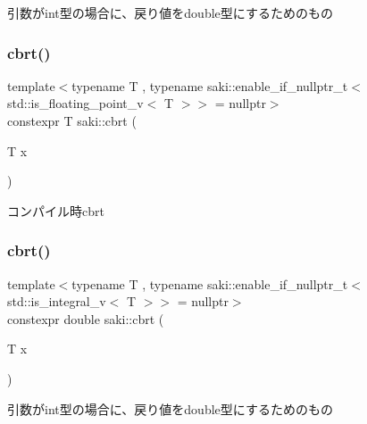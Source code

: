 引数がint型の場合に、戻り値をdouble型にするためのもの 

\mbox{\label{namespacesaki_a8836c929b71a61cf0151d3b76eb7af15}} 
\subsubsection{\texorpdfstring{cbrt()}{cbrt()}\hspace{0.1cm}{\footnotesize\ttfamily [1/2]}}
{\footnotesize\ttfamily template$<$typename T , typename saki\+::enable\+\_\+if\+\_\+nullptr\+\_\+t$<$ std\+::is\+\_\+floating\+\_\+point\+\_\+v$<$ T $>$$>$  = nullptr$>$ \\
constexpr T saki\+::cbrt (\begin{DoxyParamCaption}\item[{T}]{x }\end{DoxyParamCaption})}



コンパイル時cbrt 

\mbox{\label{namespacesaki_a5a3d1ab0508dcff1fb2e17a4ef8a855d}} 
\subsubsection{\texorpdfstring{cbrt()}{cbrt()}\hspace{0.1cm}{\footnotesize\ttfamily [2/2]}}
{\footnotesize\ttfamily template$<$typename T , typename saki\+::enable\+\_\+if\+\_\+nullptr\+\_\+t$<$ std\+::is\+\_\+integral\+\_\+v$<$ T $>$$>$  = nullptr$>$ \\
constexpr double saki\+::cbrt (\begin{DoxyParamCaption}\item[{T}]{x }\end{DoxyParamCaption})}



引数がint型の場合に、戻り値をdouble型にするためのもの 

\mbox{\label{namespacesaki_abd8c75003f2a213607842f5d82eac806}} 
